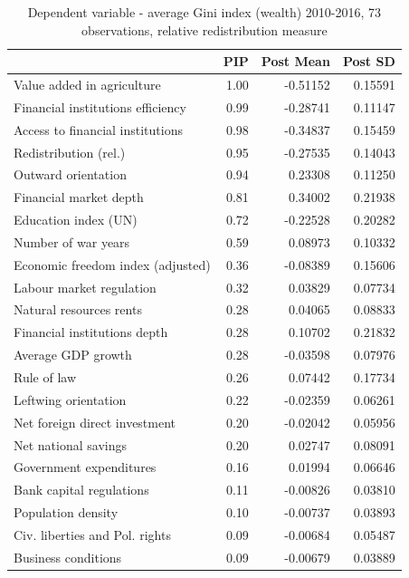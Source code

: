 \begin{refsection}
\begin{subappendices}
    \begin{table}[!ht]
    \footnotesize
    \centering
    \caption{Dependent variable - average Gini index (wealth) 2010-2016, 73 observations, relative redistribution measure}
    \label{ch3table:relred}
    \begin{tabular}{lrrr}
      \toprule
     & \ac{PIP} & Post Mean & Post SD \\ 
      \midrule
      Value added in agriculture & 1.00 & -0.51152 & 0.15591 \\ 
      Financial institutions efficiency & 0.99 & -0.28741 & 0.11147 \\ 
      Access to financial institutions & 0.98 & -0.34837 & 0.15459 \\ 
      Redistribution (rel.) & 0.95 & -0.27535 & 0.14043 \\ 
      Outward orientation & 0.94 & 0.23308 & 0.11250 \\ 
      Financial market depth & 0.81 & 0.34002 & 0.21938 \\ 
      Education index (UN) & 0.72 & -0.22528 & 0.20282 \\ 
      Number of war years & 0.59 & 0.08973 & 0.10332 \\ 
      Economic freedom index (adjusted) & 0.36 & -0.08389 & 0.15606 \\ 
      Labour market regulation & 0.32 & 0.03829 & 0.07734 \\ 
      Natural resources rents & 0.28 & 0.04065 & 0.08833 \\ 
      Financial institutions depth & 0.28 & 0.10702 & 0.21832 \\ 
      Average GDP growth & 0.28 & -0.03598 & 0.07976 \\ 
      Rule of law & 0.26 & 0.07442 & 0.17734 \\ 
      Leftwing orientation & 0.22 & -0.02359 & 0.06261 \\ 
      Net foreign direct investment & 0.20 & -0.02042 & 0.05956 \\ 
      Net national savings & 0.20 & 0.02747 & 0.08091 \\ 
      Government expenditures & 0.16 & 0.01994 & 0.06646 \\ 
      Bank capital regulations & 0.11 & -0.00826 & 0.03810 \\ 
      Population density & 0.10 & -0.00737 & 0.03893 \\ 
      Civ. liberties and Pol. rights & 0.09 & -0.00684 & 0.05487 \\ 
      Business conditions & 0.09 & -0.00679 & 0.03889 \\ 

\end{tabular}
\end{table}
\end{subappendices}
\end{refsection}
